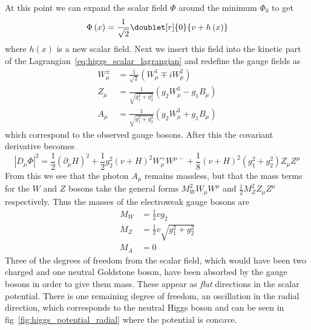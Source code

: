 At this point we can expand the scalar field $\Phi$ around the minimum $\Phi_{0}$ to get
\begin{equation}\label{eq:scalar_field_with_higgs}
	\Phi\left(x\right)=\frac{1}{\sqrt{2}}\doublet[r]{0}{v+h\left(x\right)}
\end{equation}
where $h\left(x\right)$ is a new scalar field.
Next we insert this field into the kinetic part of the Lagrangian~\ref{eq:higgs_scalar_lagrangian} and redefine the gauge fields as
\begin{align}
	\label{eq:massive_W}W_{\mu}^{\pm}&=\frac{1}{\sqrt{2}}\left(W_{\mu}^{1}{\mp}iW_{\mu}^{2}\right)\\
	\label{eq:massive_Z}Z_{\mu}&=\frac{1}{\sqrt{g_{1}^{2}+g_{2}^{2}}}\left(g_{2}W_{\mu}^{3}-g_{1}B_{\mu}\right)\\
	\label{eq:massless_gamma}A_{\mu}&=\frac{1}{\sqrt{g_{1}^{2}+g_{2}^{2}}}\left(g_{2}W_{\mu}^{3}+g_{1}B_{\mu}\right)
\end{align}
which correspond to the observed gauge bosons.
After this the covariant derivative becomes
\begin{equation}
	|D_{\mu}\Phi|^{2}=\frac{1}{2}\left(\partial_{\mu}H\right)^{2}+\frac{1}{2}g_{2}^{2}\left(v+H\right)^{2}W_{\mu}^{+}W^{{\mu}-}+\frac{1}{8}\left(v+H\right)^{2}\left(g_{1}^{2}+g_{2}^{2}\right)Z_{\mu}Z^{\mu}
\end{equation}
From this we see that the photon $A_{\mu}$ remains massless, but that the mass terms for the $W$ and $Z$ bosons take the general forms $M_{W}^{2}W_{\mu}W^{\mu}$ and $\frac{1}{2}M_{Z}^{2}Z_{\mu}Z^{\mu}$ respectively.
Thus the masses of the electroweak gauge bosons are
\begin{align}
	\label{eq:mass_W}M_{W}&=\frac{1}{2}vg_{2}\\
	\label{eq:mass_Z}M_{Z}&=\frac{1}{2}v\sqrt{g_{1}^{2}+g_{2}^{2}}\\
	\label{eq:mass_gamma}M_{A}&=0
\end{align}
Three of the degrees of freedom from the scalar field, which would have been two charged and one neutral Goldstone boson, have been absorbed by the gauge bosons in order to give them mass.
These appear as \textit{flat} directions in the scalar potential.
There is one remaining degree of freedom, an oscillation in the radial direction, which corresponds to the neutral Higgs boson and can be seen in fig~\ref{fig:higgs_potential_radial} where the potential is concave.

